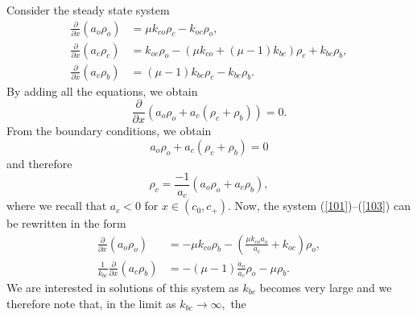 Consider the steady state system
\begin{align}
\frac{\partial}{\partial x}\left(  a_{o}\rho_{o}\right)   &  =\mu k_{co}
\rho_{c}-k_{oc}\rho_{o}, \label{101}\\
\frac{\partial}{\partial x}\left(  a_{c}\rho_{c}\right)   &  =k_{oc}\rho
_{o}-\left(  \mu k_{co}+\left(  \mu-1\right)  k_{bc}\right)  \rho_{c}
+k_{bc}\rho_{b}, \label{102}\\
\frac{\partial}{\partial x}\left(  a_{c}\rho_{b}\right)   &  =\left(
\mu-1\right)  k_{bc}\rho_{c}-k_{bc}\rho_{b}. \label{103}
\end{align}
By adding all the equations, we obtain
\begin{equation}
\frac{\partial}{\partial x}\left(  a_{o}\rho_{o}+a_{c}\left(  \rho_{c}
+\rho_{b}\right)  \right)  =0.
\end{equation}
From the boundary conditions,  we obtain
\begin{equation}
a_{o}\rho_{o}+a_{c}\left(  \rho_{c}+\rho_{b}\right)  =0
\end{equation}
and therefore
\begin{equation}
\rho_{c}=\frac{-1}{a_{c}}\left(  a_{o}\rho_{o}+a_{c}\rho_{b}\right),
\end{equation}
where we recall that  $a_{c}<0$ for $x\in\left(
c_{0},c_{+}\right)$. 
Now, the system (\ref{101})--(\ref{103}) can be rewritten in the form
\begin{align}
\frac{\partial}{\partial x}\left(  a_{o}\rho_{o}\right)   &  =-\mu k_{co}
\rho_{b}-\left(  \frac{\mu k_{co}a_{o}}{a_{c}}+k_{oc}\right)  \rho_{o},\\
\frac{1}{k_{bc}}\frac{\partial}{\partial x}\left(  a_{c}\rho_{b}\right)   &
=-\left(  \mu-1\right)  \frac{a_{o}}{a_{c}}\rho_{o}-\mu\rho_{b}.
\end{align}
We are interested in solutions of this system as $k_{bc}$ becomes very large
and we therefore note that, in the limit as $k_{bc}\rightarrow\infty,$ the

